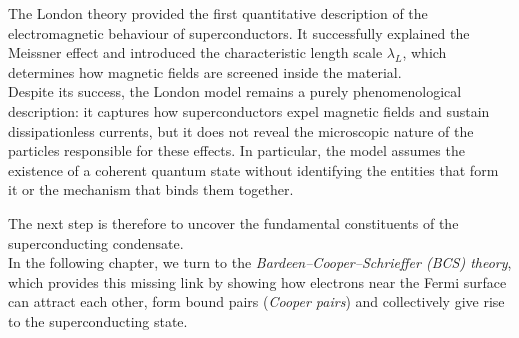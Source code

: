 The London theory provided the first quantitative description of the electromagnetic behaviour of superconductors. 
It successfully explained the Meissner effect and introduced the characteristic length scale \( \lambda_L \), which determines how magnetic fields are screened inside the material.\\
Despite its success, the London model remains a purely phenomenological description: it captures how superconductors expel magnetic fields and sustain dissipationless currents, but it does not reveal the microscopic nature of the particles responsible for these effects. In particular, the model assumes the existence of a coherent quantum state without identifying the entities that form it or the mechanism that binds them together.

The next step is therefore to uncover the fundamental constituents of the superconducting condensate.\\
In the following chapter, we turn to the \textit{Bardeen–Cooper–Schrieffer (BCS) theory}, which provides this missing link by showing how electrons near the Fermi surface can attract each other, form bound pairs (\textit{Cooper pairs}) and collectively give rise to the superconducting state.
